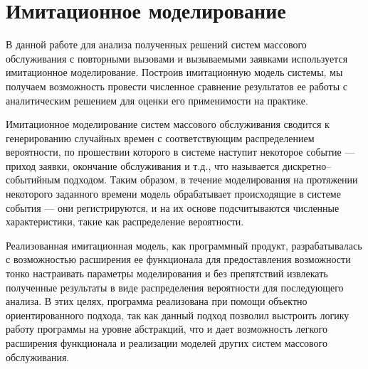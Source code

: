 \section{Имитационное моделирование}
В данной работе для анализа полученных решений систем массового обслуживания с повторными вызовами и вызываемыми заявками используется имитационное моделирование. Построив имитационную модель системы, мы получаем возможность провести численное сравнение результатов ее работы с аналитическим решением для оценки его применимости на практике.

Имитационное моделирование систем массового обслуживания сводится к генерированию случайных времен с соответствующим распределением вероятности, по прошествии которого в системе наступит некоторое событие --- приход заявки, окончание обслуживания и т.д., что называется дискретно--событийным подходом. Таким образом, в течение моделирования на протяжении некоторого заданного времени модель обрабатывает происходящие в системе события --- они регистрируются, и на их основе подсчитываются численные характеристики, такие как распределение вероятности.

Реализованная имитационная модель, как программный продукт, разрабатывалась с возможностью расширения ее функционала для предоставления возможности тонко настраивать параметры моделирования и без препятствий извлекать полученные результаты в виде распределения вероятности для последующего анализа. В этих целях, программа реализована при помощи объектно ориентированного подхода, так как данный подход позволил выстроить логику работу программы на уровне абстракций, что и дает возможность легкого расширения функционала и реализации моделей других систем массового обслуживания.

